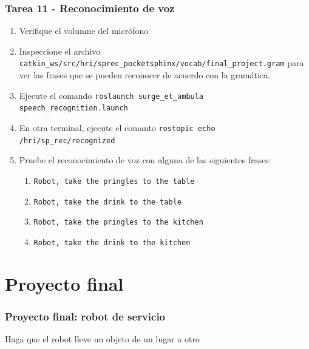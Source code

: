 \begin{frame}\frametitle{Tarea 11 - Reconocimiento de voz}
  \begin{enumerate}
  \item Verifique el volumne del micrófono
  \item Inspeccione el archivo \texttt{catkin\_ws/src/hri/sprec\_pocketsphinx/vocab/final\_project.gram} para ver las frases que se pueden reconocer de acuerdo con la gramática.
  \item Ejecute el comando \texttt{roslaunch surge\_et\_ambula speech\_recognition.launch}
  \item En otra terminal, ejecute el comanto \texttt{rostopic echo /hri/sp\_rec/recognized}
  \item Pruebe el reconocimiento de voz con alguna de las siguientes frases:
    \begin{enumerate}
    \item \texttt{Robot, take the pringles to the table}
    \item \texttt{Robot, take the drink to the table}
    \item \texttt{Robot, take the pringles to the kitchen}
    \item \texttt{Robot, take the drink to the kitchen}
    \end{enumerate}
  \end{enumerate}
\end{frame}


\section{Proyecto final}

\begin{frame}\frametitle{Proyecto final: robot de servicio}
  \Large{Haga que el robot lleve un objeto de un lugar a otro}
\end{frame}
